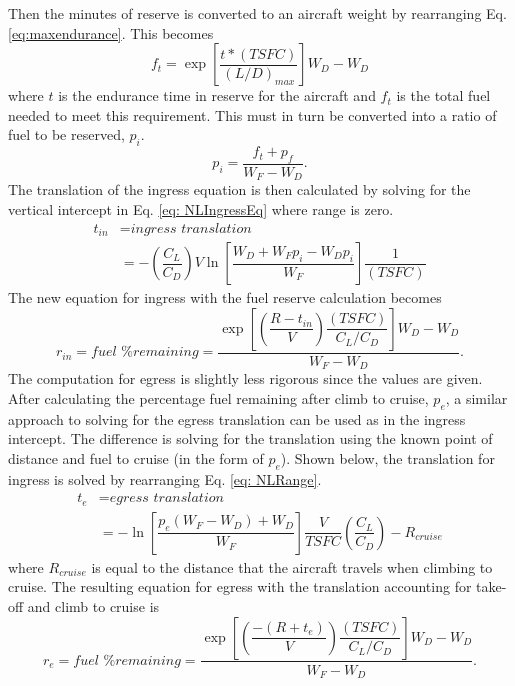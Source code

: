 Then the minutes of reserve is converted to an aircraft weight by rearranging Eq. \ref{eq:maxendurance}. This becomes
\begin{equation*}
    f_t = \exp\left[\dfrac{t*(TSFC)}{(L/D)_{max}}\right]W_D-W_D
\end{equation*}
where $t$ is the endurance time in reserve for the aircraft and $f_t$ is the total fuel needed to meet this requirement. This must in turn be converted into a ratio of fuel to be reserved, $p_i$.
\begin{equation*}
    p_i = \dfrac{f_t + p_f}{W_F-W_D}.
\end{equation*}
The translation of the ingress equation is then calculated by solving for the vertical intercept in Eq. \ref{eq: NLIngressEq} where range is zero.
\begin{align*}
    t_{in}&= \textit{ingress translation} \\ &=-\left(\dfrac{C_L}{C_D}\right)V\ln\left[\dfrac{W_D+W_Fp_i- W_Dp_i}{W_F}\right]\dfrac{1}{(TSFC)}
\end{align*}
The new equation for ingress with the fuel reserve calculation becomes
\begin{equation}
    r_{in} = \textit{fuel \% remaining} =\dfrac{\exp\left[\left(\dfrac{R-t_{in}}{V}\right)\dfrac{(TSFC)}{C_L/C_D}\right]W_D-W_D}{W_F - W_D}.
    \label{eq: NLIngressFull}
\end{equation}
The computation for egress is slightly less rigorous since the values are given. After calculating the percentage fuel remaining after climb to cruise, $p_e$, a similar approach to solving for the egress translation can be used as in the ingress intercept. The difference is solving for the translation using the known point of distance and fuel to cruise (in the form of $p_e$). Shown below, the translation for ingress is solved by rearranging Eq. \ref{eq: NLRange}. 
\begin{align*}
    t_e &= \textit{egress translation}\\
    &=-\ln\left[\dfrac{p_e(W_F-W_D)+W_D}{W_F}\right]\dfrac{V}{TSFC}\left(\dfrac{C_L}{C_D}\right)-R_{cruise}
\end{align*}
where $R_{cruise}$ is equal to the distance that the aircraft travels when climbing to cruise. The resulting equation for egress with the translation accounting for take-off and climb to cruise is 
\begin{equation}
    r_e = \textit{fuel \% remaining} = \dfrac{\exp\left[\left(\dfrac{-(R+t_e)}{V}\right)\dfrac{(TSFC)}{C_L/C_D}\right]W_D-W_D}{W_F - W_D}.
    \label{eq: NLEgressEqFull}
\end{equation}
